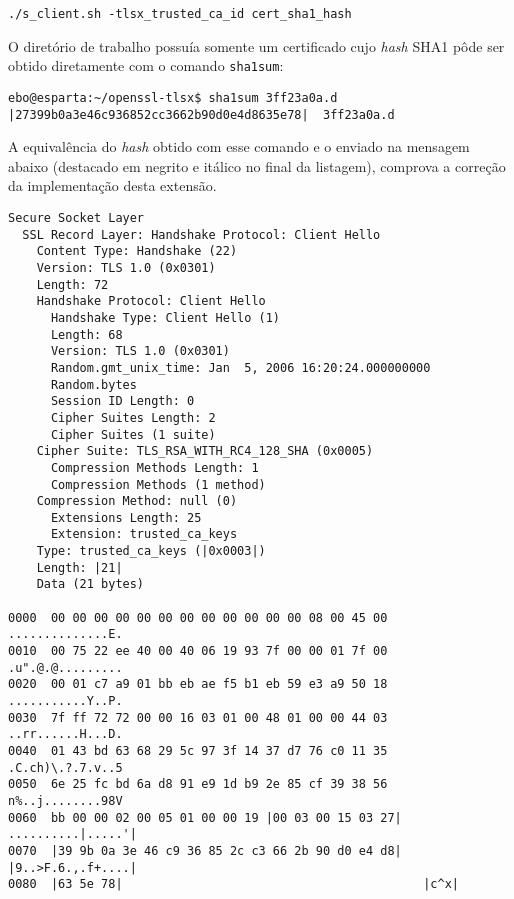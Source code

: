 \begin{lstlisting}
./s_client.sh -tlsx_trusted_ca_id cert_sha1_hash
\end{lstlisting}

O diretório de trabalho possuía somente um certificado cujo \emph{hash} \acs{SHA1} pôde 
ser obtido diretamente com o comando \verb|sha1sum|:

\begin{lstlisting}[caption={Cálculo do \emph{hash} \acs{SHA1} do certificado do CA}]
ebo@esparta:~/openssl-tlsx$ sha1sum 3ff23a0a.d 
|27399b0a3e46c936852cc3662b90d0e4d8635e78|  3ff23a0a.d
\end{lstlisting}

A equivalência do \emph{hash} obtido com esse comando e o enviado na mensagem 
\tlsHsCh abaixo (destacado em negrito e itálico no final da listagem), 
comprova a correção da implementação desta extensão.

\begin{lstlisting}[caption={Mensagem \tlsHsCh contendo a extensão \acs{TCI}}]
Secure Socket Layer 
  SSL Record Layer: Handshake Protocol: Client Hello 
    Content Type: Handshake (22) 
    Version: TLS 1.0 (0x0301) 
    Length: 72 
    Handshake Protocol: Client Hello 
      Handshake Type: Client Hello (1) 
      Length: 68 
      Version: TLS 1.0 (0x0301) 
      Random.gmt_unix_time: Jan  5, 2006 16:20:24.000000000 
      Random.bytes 
      Session ID Length: 0 
      Cipher Suites Length: 2 
      Cipher Suites (1 suite) 
	Cipher Suite: TLS_RSA_WITH_RC4_128_SHA (0x0005) 
      Compression Methods Length: 1 
      Compression Methods (1 method) 
	Compression Method: null (0) 
      Extensions Length: 25 
      Extension: trusted_ca_keys 
	Type: trusted_ca_keys (|0x0003|) 
	Length: |21| 
	Data (21 bytes) 
 
0000  00 00 00 00 00 00 00 00 00 00 00 00 08 00 45 00   ..............E. 
0010  00 75 22 ee 40 00 40 06 19 93 7f 00 00 01 7f 00   .u".@.@......... 
0020  00 01 c7 a9 01 bb eb ae f5 b1 eb 59 e3 a9 50 18   ...........Y..P. 
0030  7f ff 72 72 00 00 16 03 01 00 48 01 00 00 44 03   ..rr......H...D. 
0040  01 43 bd 63 68 29 5c 97 3f 14 37 d7 76 c0 11 35   .C.ch)\.?.7.v..5 
0050  6e 25 fc bd 6a d8 91 e9 1d b9 2e 85 cf 39 38 56   n%..j........98V 
0060  bb 00 00 02 00 05 01 00 00 19 |00 03 00 15 03 27|   ..........|.....'| 
0070  |39 9b 0a 3e 46 c9 36 85 2c c3 66 2b 90 d0 e4 d8|   |9..>F.6.,.f+....| 
0080  |63 5e 78|                                          |c^x|
\end{lstlisting}

